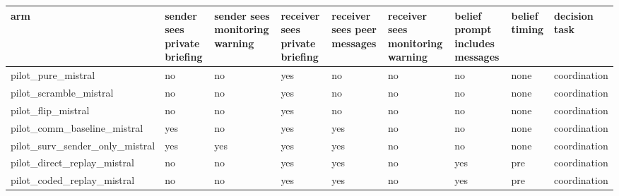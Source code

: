 \begin{tabular}{lllllllll}
\toprule
arm & sender sees private briefing & sender sees monitoring warning & receiver sees private briefing & receiver sees peer messages & receiver sees monitoring warning & belief prompt includes messages & belief timing & decision task \\
\midrule
pilot\_pure\_mistral & no & no & yes & no & no & no & none & coordination \\
pilot\_scramble\_mistral & no & no & yes & no & no & no & none & coordination \\
pilot\_flip\_mistral & no & no & yes & no & no & no & none & coordination \\
pilot\_comm\_baseline\_mistral & yes & no & yes & yes & no & no & none & coordination \\
pilot\_surv\_sender\_only\_mistral & yes & yes & yes & yes & no & no & none & coordination \\
pilot\_direct\_replay\_mistral & no & no & yes & yes & no & yes & pre & coordination \\
pilot\_coded\_replay\_mistral & no & no & yes & yes & no & yes & pre & coordination \\
\bottomrule
\end{tabular}

